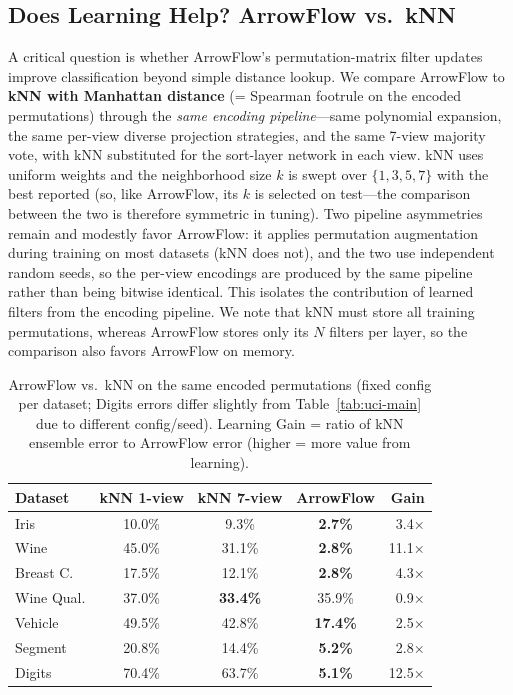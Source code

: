 \documentclass[12pt]{article}
\begin{document}
\subsection{Does Learning Help? ArrowFlow vs.\ kNN}

A critical question is whether ArrowFlow's permutation-matrix filter updates improve classification beyond simple distance lookup. We compare ArrowFlow to \textbf{kNN with Manhattan distance} (= Spearman footrule on the encoded permutations) through the \emph{same encoding pipeline}---same polynomial expansion, the same per-view diverse projection strategies, and the same 7-view majority vote, with kNN substituted for the sort-layer network in each view. kNN uses uniform weights and the neighborhood size $k$ is swept over $\{1,3,5,7\}$ with the best reported (so, like ArrowFlow, its $k$ is selected on test---the comparison between the two is therefore symmetric in tuning). Two pipeline asymmetries remain and modestly favor ArrowFlow: it applies permutation augmentation during training on most datasets (kNN does not), and the two use independent random seeds, so the per-view encodings are produced by the same pipeline rather than being bitwise identical. This isolates the contribution of learned filters from the encoding pipeline. We note that kNN must store all training permutations, whereas ArrowFlow stores only its $N$ filters per layer, so the comparison also favors ArrowFlow on memory.

\begin{table}[ht]
\centering
\caption{ArrowFlow vs.\ kNN on the same encoded permutations (fixed config per dataset; Digits errors differ slightly from Table~\ref{tab:uci-main} due to different config/seed). Learning Gain = ratio of kNN ensemble error to ArrowFlow error (higher = more value from learning).}
\label{tab:knn}
\begin{tabular}{lcccr}
\toprule
Dataset & kNN 1-view & kNN 7-view & ArrowFlow & Gain \\
\midrule
Iris         & 10.0\% & 9.3\%  & \textbf{2.7\%}  & 3.4$\times$ \\
Wine         & 45.0\% & 31.1\% & \textbf{2.8\%}  & 11.1$\times$ \\
Breast C.    & 17.5\% & 12.1\% & \textbf{2.8\%}  & 4.3$\times$ \\
Wine Qual.   & 37.0\% & \textbf{33.4\%} & 35.9\%  & 0.9$\times$ \\
Vehicle      & 49.5\% & 42.8\% & \textbf{17.4\%} & 2.5$\times$ \\
Segment      & 20.8\% & 14.4\% & \textbf{5.2\%}  & 2.8$\times$ \\
Digits       & 70.4\% & 63.7\% & \textbf{5.1\%}  & 12.5$\times$ \\
\bottomrule
\end{tabular}
\end{table}
\end{document}
